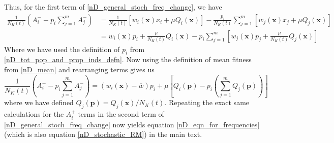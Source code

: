 Thus, for the first term of \eqref{nD_general_stoch_freq_change}, we have
\begin{align*}
\frac{1}{N_K(t)}\left(A^{-}_{i} - p_i\sum\limits_{j=1}^{m}A^{-}_{j}\right) &=  \frac{1}{N_K(t)}\left[w_i(\mathbf{x})x_i + \mu Q_i(\mathbf{x})\right] - \frac{p_i}{N_K(t)}\sum\limits_{j=1}^{m}\left[w_j(\mathbf{x})x_j + \mu Q_j(\mathbf{x})\right]\\
&= w_i(\mathbf{x})p_i + \frac{\mu}{N_K(t)}Q_i(\mathbf{x}) - p_i\sum\limits_{j=1}^{m}\left[w_j(\mathbf{x})p_j + \frac{\mu}{N_K(t)}Q_j(\mathbf{x})\right]
\end{align*}
Where we have used the definition of $p_i$ from \eqref{nD_tot_pop_and_prop_inds_defn}. Now using the definition of mean fitness from \eqref{nD_mean} and rearranging terms gives us
\begin{equation}
\frac{1}{N_K(t)}\left(A^{-}_{i} - p_i\sum\limits_{j=1}^{m}A^{-}_{j}\right) = (w_i(\mathbf{x}) - \overline{w})p_i + \mu\left[Q_i(\mathbf{p}) - p_i\left(\sum\limits_{j=1}^{m}Q_j(\mathbf{p})\right)\right]
\end{equation}
where we have defined $Q_j(\mathbf{p}) = Q_j(\mathbf{x})/N_K(t)$. Repeating the exact same calculations for the $A^{+}_i$ terms in the second term of \eqref{nD_general_stoch_freq_change} now yields equation \eqref{nD_eqn_for_frequencies} (which is also equation \eqref{nD_stochastic_RM}) in the main text.